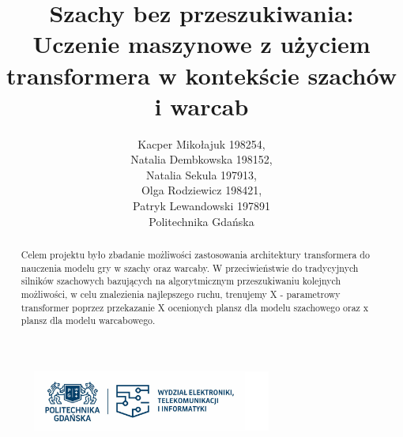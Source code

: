 \documentclass[12pt]{article}
\title{Szachy bez przeszukiwania: \\Uczenie maszynowe z użyciem transformera w kontekście szachów i warcab}
\author{Kacper Mikołajuk 198254, \\Natalia Dembkowska 198152, \\Natalia Sekula 197913, \\Olga Rodziewicz 198421, \\Patryk Lewandowski 197891 \\ Politechnika Gdańska }
\date{}
\begin{document}
\maketitle

\begin{abstract}
Celem projektu było zbadanie możliwości zastosowania architektury transformera do nauczenia modelu gry w szachy oraz warcaby. W przeciwieństwie do tradycyjnych silników szachowych bazujących na algorytmicznym przeszukiwaniu kolejnych możliwości, w celu znalezienia najlepszego ruchu, trenujemy X - parametrowy transformer poprzez przekazanie X ocenionych plansz dla modelu szachowego oraz x plansz dla modelu warcabowego.
\end{abstract}

\begin{figure}[b]
  \centering
  \includegraphics[width=0.7\textwidth]{logotyp-PG-i-WETI.jpg}

\end{figure}

\clearpage
\tableofcontents
\clearpage
\end{document}
